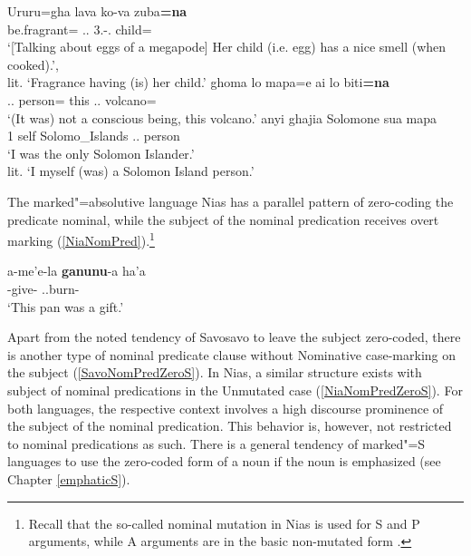 \begin{exe}\ex\label{SavNomPred}
\begin{xlist}
\ex\gll Ururu=gha lava ko-va zuba\textbf{=na}\\
be.fragrant=\pl{} \propr{}.\sg{}.\mas{} 3\sg{}.\fem{}-\gen{}.\mas{} child=\nom{}\\
\glt `[Talking about eggs of a megapode] Her child (i.e. egg) has a nice smell (when
cooked).',\\
lit. `Fragrance having (is) her child.'
\ex\gll ghoma lo mapa=e  ai lo biti\textbf{=na}\\
\Neg{} \deter{}.\sg{}.\mas{} person=\emphat{} this \deter{}.\sg{}.\mas{} volcano=\nom{}\\
\glt `(It was) not a conscious being, this volcano.'
\ex\gll  anyi ghajia Solomone sua mapa\\
1\sg{} self Solomo\_Islands \att{}.\sg{}.\mas{} person\\
\glt `I was the only Solomon Islander.'\\
lit. `I myself (was) a Solomon Island person.'
\end{xlist}
\end{exe}

The marked"=absolutive language Nias has a parallel pattern of zero-coding the predicate nominal, while the subject of the nominal predication receives overt marking (\ref{NiaNomPred}).\footnote{Recall that the so-called nominal mutation in Nias is used for S and P arguments, while A arguments are in the basic non-mutated form \citep{Brown:2001}.}  

\begin{exe}
\ex\label{NiaNomPred}
\gll a-me'e-la \textbf{ganunu}-a ha'a\\
\ipfv{}-give-\NR{} \ipfv{}.\mut{}.burn-\nmlz{} \prox{}\\
\glt `This pan was a gift.'
\end{exe}

Apart from the noted tendency of Savosavo to leave the subject zero-coded, there is another type of nominal predicate clause without Nominative case-mark\-ing on the subject (\ref{SavoNomPredZeroS}). 
In Nias, a similar structure exists with subject of nominal predications in the Unmutated case (\ref{NiaNomPredZeroS}). 
For both languages, the respective context involves a high discourse prominence of the subject of the nominal predication.  
This behavior is, however, not restricted to nominal predications as such. 
There is a general tendency of marked"=S languages to use the zero-coded form of a noun if the noun is emphasized (see Chapter \ref{emphaticS}).


